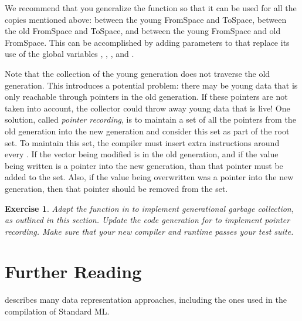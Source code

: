 \documentclass[7x10]{TimesAPriori_MIT}%
\newtheorem{exercise}[theorem]{Exercise}
\numberwithin{theorem}{chapter}
\numberwithin{definition}{chapter}
\numberwithin{equation}{chapter}
\begin{document}
{We recommend that you generalize the  function so that it
can be used for all the copies mentioned above: between the young
FromSpace and ToSpace, between the old FromSpace and ToSpace, and
between the young FromSpace and old FromSpace. This can be
accomplished by adding parameters to  that replace its
use of the global variables ,
, , and .

Note that the collection of the young generation does not traverse the
old generation. This introduces a potential problem: there may be
young data that is only reachable through pointers in the old
generation. If these pointers are not taken into account, the
collector could throw away young data that is live!  One solution,
called \emph{pointer recording}, is to maintain a set of all the
pointers from the old generation into the new generation and consider
this set as part of the root set.  To maintain this set, the compiler
must insert extra instructions around every . If the
vector being modified is in the old generation, and if the value being
written is a pointer into the new generation, than that pointer must
be added to the set. Also, if the value being overwritten was a
pointer into the new generation, then that pointer should be removed
from the set.

\begin{exercise}\normalfont\normalsize
  Adapt the  function in  to implement
  generational garbage collection, as outlined in this section.
  Update the code generation for  to implement
  pointer recording. Make sure that your new compiler and runtime
  passes your test suite.
\end{exercise}

\fi}

\section{Further Reading}

\citet{Appel90} describes many data representation approaches,
including the ones used in the compilation of Standard ML.
\end{document}
